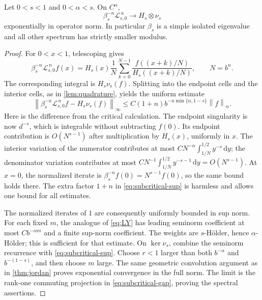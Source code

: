 \documentclass[11pt,a4paper]{article}
\numberwithin{equation}{section}
\theoremstyle{definition}
\theoremstyle{remark}
\newcommand{\dd}{\,\mathrm d}
\newcommand{\Lop}{\mathcal L}
\newcommand{\norm}[1]{\left\lVert#1\right\rVert}
\begin{document}
\begin{lemma}
\label{lem:subcritical-gap}
Let $0<s<1$ and $0<\alpha<s$. On $C^\alpha$,
\begin{equation}
 \beta_s^{-n}\Lop_{s,0}^{\,n}
 \longrightarrow H_s\otimes\nu_s
 \label{eq:subcritical-gap}
\end{equation}
exponentially in operator norm. In particular $\beta_s$ is a simple
isolated eigenvalue and all other spectrum has strictly smaller modulus.
\end{lemma}
\begin{proof}
For $0<x<1$, telescoping gives
\begin{equation}
 \beta_s^{-n}\Lop_{s,0}^{\,n}f(x)
 =H_s(x)\frac1N\sum_{k=0}^{N-1}
 \frac{f((x+k)/N)}{H_s((x+k)/N)},\qquad N=b^n.
 \label{eq:subcritical-riemann}
\end{equation}
The corresponding integral is $H_s\nu_s(f)$.
Splitting into the endpoint cells and the interior cells, as in
\cref{lem:quadrature}, yields the uniform estimate
\begin{equation}
 \left\|\beta_s^{-n}\Lop_{s,0}^{\,n}f-H_s\nu_s(f)\right\|_\infty
 \le C(1+n)b^{-n\min\{\alpha,1-s\}}\norm f_\alpha.
 \label{eq:subcritical-sup}
\end{equation}
Here is the difference from the critical calculation. The endpoint
singularity is now $d^{-s}$, which is integrable without subtracting
$f(0)$. Its endpoint contribution is $O(N^{s-1})$ after multiplication
by $H_s(x)$, uniformly in $x$. The interior variation of the numerator
contributes at most $CN^{-\alpha}\int_{1/N}^{1/2}y^{-s}\dd y$;
the denominator variation contributes at most
$CN^{-1}\int_{1/N}^{1/2}y^{-s-1}\dd y=O(N^{s-1})$.
At $x=0$, the normalized iterate is
$\beta_s^{-n}f(0)=N^{s-1}f(0)$, so the same bound holds there.
The extra factor $1+n$ in \cref{eq:subcritical-sup} is harmless and
allows one bound for all estimates.

The normalized iterates of $1$ are consequently uniformly bounded in
sup norm. For each fixed $m$, the analogue of \cref{eq:LY} has leading
seminorm coefficient at most $Cb^{-\alpha m}$ and a finite sup-norm
coefficient. The weights are $s$-H\"older, hence $\alpha$-H\"older;
this is sufficient for that estimate. On $\ker\nu_s$, combine the
seminorm recurrence with \cref{eq:subcritical-sup}. Choose $r<1$
larger than both $b^{-\alpha}$ and $b^{-(1-s)}$, and then choose $m$
large. The same geometric convolution argument as in
\cref{thm:jordan} proves exponential convergence in the full norm.
The limit is the rank-one commuting projection in
\cref{eq:subcritical-gap}, proving the spectral assertions.
\end{proof}
\end{document}
